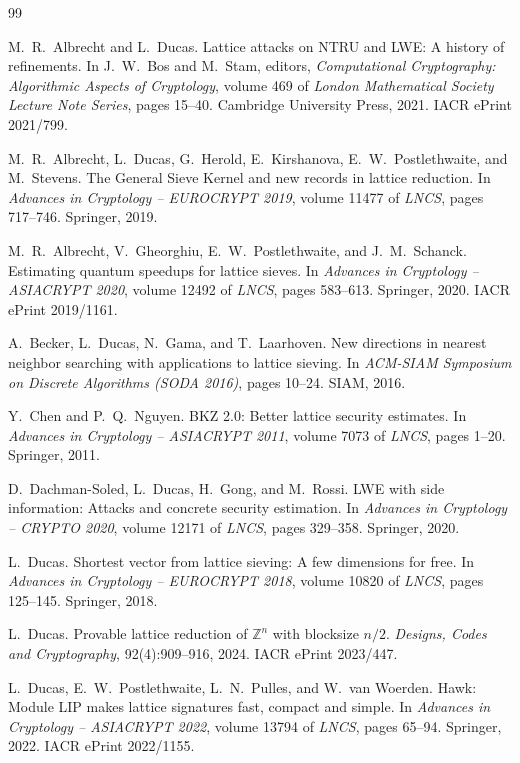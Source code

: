\documentclass[11pt,a4paper]{article}
\theoremstyle{definition}
\newcommand{\Z}{\mathbb{Z}}
\begin{document}
\begin{thebibliography}{99}

M.~R.~Albrecht and L.~Ducas.
\newblock Lattice attacks on {NTRU} and {LWE}: A history of refinements.
\newblock In J.~W.~Bos and M.~Stam, editors, \emph{Computational Cryptography: Algorithmic Aspects of Cryptology}, volume 469 of \emph{London Mathematical Society Lecture Note Series}, pages 15--40. Cambridge University Press, 2021. IACR ePrint 2021/799.

M.~R.~Albrecht, L.~Ducas, G.~Herold, E.~Kirshanova, E.~W.~Postlethwaite, and M.~Stevens.
\newblock The General Sieve Kernel and new records in lattice reduction.
\newblock In \emph{Advances in Cryptology -- EUROCRYPT 2019}, volume 11477 of \emph{LNCS}, pages 717--746. Springer, 2019.

M.~R.~Albrecht, V.~Gheorghiu, E.~W.~Postlethwaite, and J.~M.~Schanck.
\newblock Estimating quantum speedups for lattice sieves.
\newblock In \emph{Advances in Cryptology -- ASIACRYPT 2020}, volume 12492 of \emph{LNCS}, pages 583--613. Springer, 2020. IACR ePrint 2019/1161.

A.~Becker, L.~Ducas, N.~Gama, and T.~Laarhoven.
\newblock New directions in nearest neighbor searching with applications to lattice sieving.
\newblock In \emph{ACM-SIAM Symposium on Discrete Algorithms (SODA 2016)}, pages 10--24. SIAM, 2016.

Y.~Chen and P.~Q.~Nguyen.
\newblock BKZ 2.0: Better lattice security estimates.
\newblock In \emph{Advances in Cryptology -- ASIACRYPT 2011}, volume 7073 of \emph{LNCS}, pages 1--20. Springer, 2011.

D.~Dachman-Soled, L.~Ducas, H.~Gong, and M.~Rossi.
\newblock LWE with side information: Attacks and concrete security estimation.
\newblock In \emph{Advances in Cryptology -- CRYPTO 2020}, volume 12171 of \emph{LNCS}, pages 329--358. Springer, 2020.

L.~Ducas.
\newblock Shortest vector from lattice sieving: A few dimensions for free.
\newblock In \emph{Advances in Cryptology -- EUROCRYPT 2018}, volume 10820 of \emph{LNCS}, pages 125--145. Springer, 2018.

L.~Ducas.
\newblock Provable lattice reduction of $\Z^n$ with blocksize $n/2$.
\newblock \emph{Designs, Codes and Cryptography}, 92(4):909--916, 2024. IACR ePrint 2023/447.

L.~Ducas, E.~W.~Postlethwaite, L.~N.~Pulles, and W.~van Woerden.
\newblock Hawk: Module LIP makes lattice signatures fast, compact and simple.
\newblock In \emph{Advances in Cryptology -- ASIACRYPT 2022}, volume 13794 of \emph{LNCS}, pages 65--94. Springer, 2022. IACR ePrint 2022/1155.


\end{thebibliography}
\end{document}
